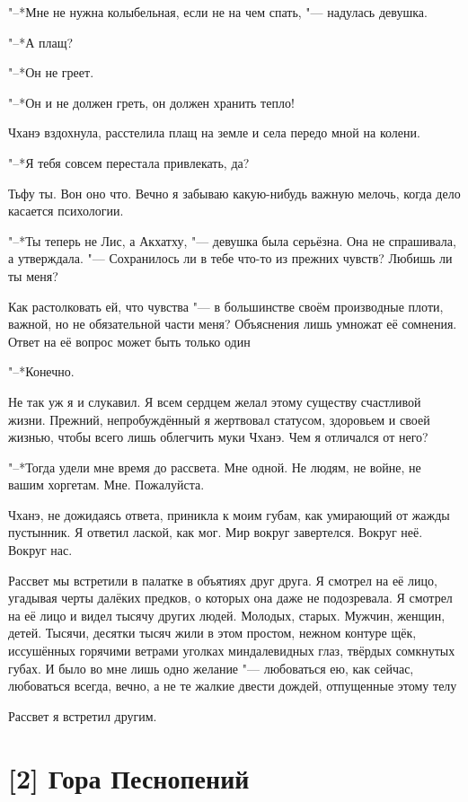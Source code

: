 "--*Мне не нужна колыбельная, если не на чем спать, "--- надулась девушка.

"--*А плащ?

"--*Он не греет.

"--*Он и не должен греть, он должен хранить тепло!

Чханэ вздохнула, расстелила плащ на земле и села передо мной на колени.

"--*Я тебя совсем перестала привлекать, да?

Тьфу ты.
Вон оно что.
Вечно я забываю какую-нибудь важную мелочь, когда дело касается психологии.

"--*Ты теперь не Лис, а Акхатху, "--- девушка была серьёзна.
Она не спрашивала, а утверждала.
"--- Сохранилось ли в тебе что-то из прежних чувств?
Любишь ли ты меня?

Как растолковать ей, что чувства "--- в большинстве своём производные плоти, важной, но не обязательной части меня?
Объяснения лишь умножат её сомнения.
Ответ на её вопрос может быть только один\ldotst

"--*Конечно.

Не так уж я и слукавил.
Я всем сердцем желал этому существу счастливой жизни.
Прежний, непробуждённый я жертвовал статусом, здоровьем и своей жизнью, чтобы всего лишь облегчить муки Чханэ.
Чем я отличался от него?

"--*Тогда удели мне время до рассвета.
Мне одной.
Не людям, не войне, не вашим хоргетам.
Мне.
Пожалуйста.

Чханэ, не дожидаясь ответа, приникла к моим губам, как умирающий от жажды пустынник.
Я ответил лаской, как мог.
Мир вокруг завертелся.
Вокруг неё.
Вокруг нас.

Рассвет мы встретили в палатке в объятиях друг друга.
Я смотрел на её лицо, угадывая черты далёких предков, о которых она даже не подозревала.
Я смотрел на её лицо и видел тысячу других людей.
Молодых, старых.
Мужчин, женщин, детей.
Тысячи, десятки тысяч жили в этом простом, нежном контуре щёк, иссушённых горячими ветрами уголках миндалевидных глаз, твёрдых сомкнутых губах.
И было во мне лишь одно желание "--- любоваться ею, как сейчас, любоваться всегда, вечно, а не те жалкие двести дождей, отпущенные этому телу\ldotst

Рассвет я встретил другим.

\section{[2] Гора Песнопений}

